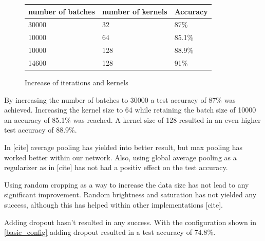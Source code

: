 \documentclass{article}
\begin{document}
\begin{enumerate}
\begin{enumerate}
\begin{item}
\begin{figure}
			\quad
			\begin{subtable}[b]{0.4\textwidth}
				\begin{tabular}{lll}
        					\toprule
        					number of batches & number of kernels    & Accuracy \\
        					\midrule
        					30000  & 32 & 87\%  \\
        					10000  & 64 & 85.1\%  \\
					10000 &128 & 88.9\%  \\
					14600  & 128 & 91\%  \\
					\bottomrule
     				\end{tabular}
				\caption{Increase of iterations and kernels}
				\label{kernels}
			\end{subtable}
		\end{figure}
		
			By increasing the number of batches to 30000 a test accuracy of 87\% was achieved. Increasing the kernel size to 64 while retaining the batch size of 10000 an accuracy of 85.1\% was reached. A kernel size of 128 resulted in an even higher test accuracy of 88.9\%. 
		\end{item}
		
		
		
		
		\begin{item}
			In [cite] average pooling has yielded into better result, but max pooling has worked better within our network.
			Also, using global average pooling as a regularizer as in [cite] has not had a positiv effect on the test accuracy.
			
		\end{item}
		
		
		
		\begin{item}
			Using random cropping as a way to increase the data size has not lead to any significant improvement. 
			Random brightness and saturation has not yielded any success, although this has helped within other implementations [cite].
		\end{item}
		
		
		
		\begin{item}
			Adding dropout hasn't resulted in any success. With the configuration shown in  \ref{basic_config} adding dropout resulted in a test accuracy of 74.8\%.
		\end{item}
		
		
		

\end{enumerate}
\end{enumerate}
\end{document}
